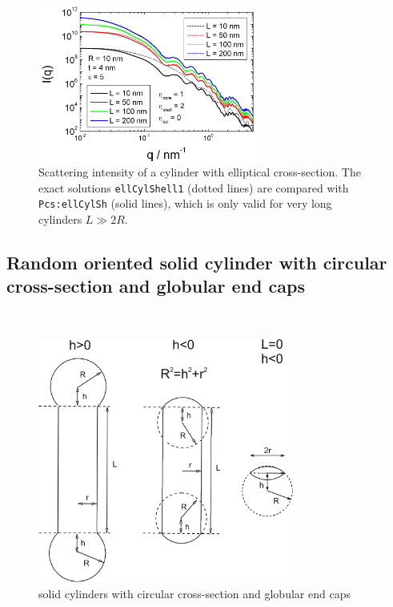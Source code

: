 \begin{figure}[htb]
\begin{center}
\includegraphics[width=0.65\textwidth]{../images/form_factor/cylindrical_obj/Pcs_ellCylShell.png}
\end{center}
\caption{Scattering intensity of a cylinder with elliptical cross-section.
The exact solutions \texttt{ellCylShell1} (dotted lines) are compared
with \texttt{Pcs:ellCylSh} (solid lines), which is only valid for very long cylinders $L \gg 2R$. }
\label{fig:Pcs_ellCylShell}
\end{figure}


\clearpage
\subsection{Random oriented solid cylinder with circular cross-section and globular end caps}
\label{sect:capped_cylinder}
~\\

\begin{figure}[htb]
\begin{center}
\includegraphics[width=0.75\textwidth]{../images/form_factor/cylindrical_obj/capped_cylinder.pdf}
\end{center}
\caption{solid cylinders with circular cross-section and globular end caps}
\label{fig:capped_cylinder}
\end{figure}

